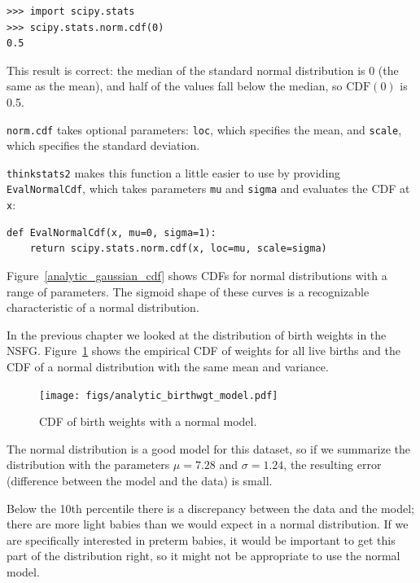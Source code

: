 \documentclass[12pt]{book}
\newcommand{\CDF}{\mathrm{CDF}}
\theoremstyle{exercise}
\begin{document}
\begin{verbatim}
>>> import scipy.stats
>>> scipy.stats.norm.cdf(0)
0.5
\end{verbatim}

This result is correct: the median of the standard normal distribution
is 0 (the same as the mean), and half of the values fall below the
median, so $\CDF(0)$ is 0.5.

{\tt norm.cdf} takes optional parameters: {\tt loc}, which
specifies the mean, and {\tt scale}, which specifies the
standard deviation.

{\tt thinkstats2} makes this function a little easier to use
by providing {\tt EvalNormalCdf}, which takes parameters {\tt mu}
and {\tt sigma} and evaluates the CDF at {\tt x}:%

\begin{verbatim}
def EvalNormalCdf(x, mu=0, sigma=1):
    return scipy.stats.norm.cdf(x, loc=mu, scale=sigma)
\end{verbatim}

Figure~\ref{analytic_gaussian_cdf} shows CDFs for normal
distributions with a range of parameters.  The sigmoid shape of these
curves is a recognizable characteristic of a normal distribution.

In the previous chapter we looked at the distribution of birth
weights in the NSFG.  Figure~\ref{analytic_birthwgt_model} shows the
empirical CDF of weights for all live births and the CDF of
a normal distribution with the same mean and variance.%
%
%
%

\begin{figure}
\centerline{\texttt{[image: figs/analytic\_birthwgt\_model.pdf]}}
\caption{CDF of birth weights with a normal model.}%
\label{analytic_birthwgt_model}
\end{figure}

The normal distribution is a good model for this dataset, so
if we summarize the distribution with the parameters
$\mu = 7.28$ and $\sigma = 1.24$, the resulting error
(difference between the model and the data) is small.%
%

Below the 10th percentile there is a discrepancy between the data
and the model; there are more light babies than we would expect in
a normal distribution.  If we are specifically interested in preterm
babies, it would be important to get this part of the distribution
right, so it might not be appropriate to use the normal
model.
\end{document}
